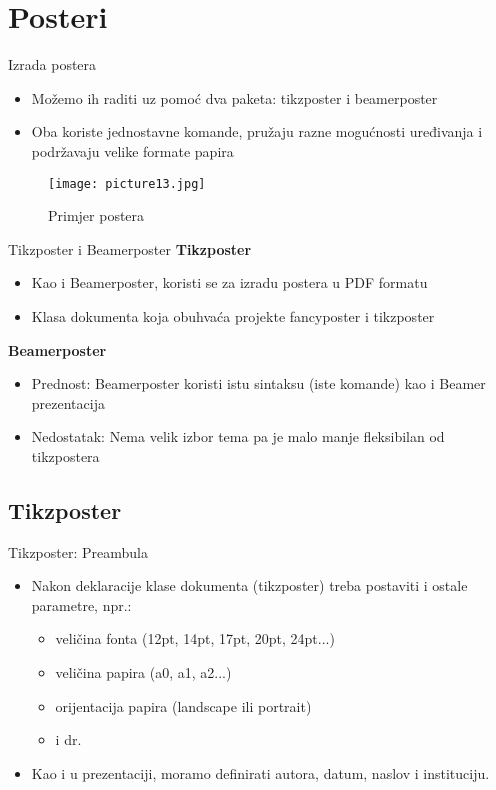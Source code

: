 \documentclass{beamer}
\begin{document}
\section{Posteri}

\begin{frame}{Izrada postera}
    \begin{itemize}
 		  \item Možemo ih raditi uz pomoć dva paketa: tikzposter i beamerposter
          \item Oba koriste jednostavne komande, pružaju razne mogućnosti uređivanja i podržavaju velike formate papira
     \end{itemize}
      \begin{figure}
 			\texttt{[image: picture13.jpg]}
 			\caption{Primjer postera}
 	  \end{figure}     
\end{frame}
     
\begin{frame}{Tikzposter i Beamerposter}
     \textbf{Tikzposter}
     \begin{itemize}
         \item Kao i Beamerposter, koristi se za izradu postera u PDF formatu
         \item Klasa dokumenta koja obuhvaća projekte fancyposter i tikzposter
     \end{itemize} 
  \textbf{Beamerposter}
 \begin{itemize}
     \item Prednost: Beamerposter koristi istu sintaksu (iste komande) kao i Beamer prezentacija
     \item Nedostatak: Nema velik izbor tema pa je malo manje fleksibilan od tikzpostera
 \end{itemize}    
 \end{frame}
 
 \subsection{Tikzposter}

 \begin{frame}{Tikzposter: Preambula}
 \begin{itemize}
     \item Nakon deklaracije klase dokumenta (tikzposter) treba postaviti i ostale parametre, npr.:
     \begin{itemize}
         \item veličina fonta (12pt, 14pt, 17pt, 20pt, 24pt...)
         \item veličina papira (a0, a1, a2...)
         \item orijentacija papira (landscape ili portrait)
         \item i dr.
     \end{itemize}
    \item  Kao i u prezentaciji, moramo definirati autora, datum, naslov i instituciju. 
 \end{itemize}
 \end{frame}
 
\end{document}
